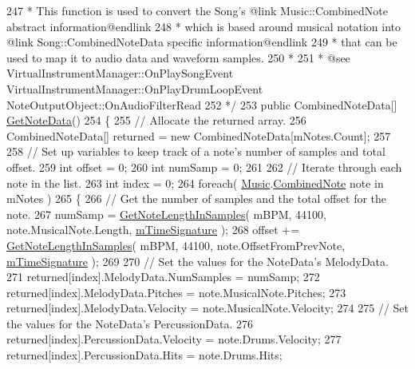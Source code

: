 \begin{DoxyCodeInclude}
247 \textcolor{comment}{     * This function is used to convert the Song's @link Music::CombinedNote abstract information@endlink}
248 \textcolor{comment}{     * which is based around musical notation into @link Song::CombinedNoteData specific
       information@endlink}
249 \textcolor{comment}{     * that can be used to map it to audio data and waveform samples.}
250 \textcolor{comment}{     * }
251 \textcolor{comment}{     * @see VirtualInstrumentManager::OnPlaySongEvent VirtualInstrumentManager::OnPlayDrumLoopEvent
       NoteOutputObject::OnAudioFilterRead}
252 \textcolor{comment}{    */}  
253     \textcolor{keyword}{public} CombinedNoteData[] \hyperlink{group___song_pub_func_gae3df1fd5448b7d9cefb0fed4af967985}{GetNoteData}()
254     \{
255         \textcolor{comment}{// Allocate the returned array.}
256         CombinedNoteData[] returned = \textcolor{keyword}{new} CombinedNoteData[mNotes.Count];
257 
258         \textcolor{comment}{// Set up variables to keep track of a note's number of samples and total offset.}
259         \textcolor{keywordtype}{int} offset = 0;
260         \textcolor{keywordtype}{int} numSamp = 0;
261 
262         \textcolor{comment}{// Iterate through each note in the list.}
263         \textcolor{keywordtype}{int} index = 0;
264         \textcolor{keywordflow}{foreach}( \hyperlink{class_music}{Music}.\hyperlink{group___music_structs_struct_music_1_1_combined_note}{CombinedNote} note in mNotes )
265         \{
266             \textcolor{comment}{// Get the number of samples and the total offset for the note.}
267             numSamp = \hyperlink{group___song_stat_func_ga03712f6defbff25d5a1cd964e4bc3211}{GetNoteLengthInSamples}( mBPM, 44100, note.MusicalNote.Length, 
      \hyperlink{group___song_priv_var_ga2b2dcc0e83e49f7303b6a1371877b25e}{mTimeSignature} );
268             offset += \hyperlink{group___song_stat_func_ga03712f6defbff25d5a1cd964e4bc3211}{GetNoteLengthInSamples}( mBPM, 44100, note.OffsetFromPrevNote, 
      \hyperlink{group___song_priv_var_ga2b2dcc0e83e49f7303b6a1371877b25e}{mTimeSignature} );
269 
270             \textcolor{comment}{// Set the values for the NoteData's MelodyData.}
271             returned[index].MelodyData.NumSamples = numSamp;
272             returned[index].MelodyData.Pitches = note.MusicalNote.Pitches;
273             returned[index].MelodyData.Velocity = note.MusicalNote.Velocity;
274 
275             \textcolor{comment}{// Set the values for the NoteData's PercussionData.}
276             returned[index].PercussionData.Velocity = note.Drums.Velocity;
277             returned[index].PercussionData.Hits = note.Drums.Hits;

\end{DoxyCodeInclude}
